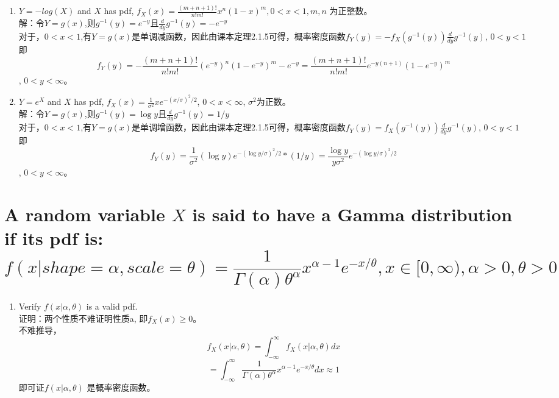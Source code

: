\documentclass [12pt]{article}
\begin{document}
\begin{CJK*}{GBK}{kai}
\begin{enumerate}
  \item[(b)]  $Y=-log(X)$ and $X$ has pdf, $f_{X}(x)=\frac{(m+n+1)!}{n!m!}x^n(1-x)^m, 0<x<1,m,n$ 为正整数。\\
  	解：令$Y=g(x)$,则$g^{-1}(y)=e^{-y}$且$\frac{d}{dy}g^{-1}(y)=-e^{-y}$\\
  	对于，$0<x<1$,有$Y=g(x)$是单调减函数，因此由课本定理2.1.5可得，概率密度函数$f_{Y}(y)=-f_{X}(g^{-1}(y))\frac{d}{dy}g^{-1}(y)$, $0<y<1$\\
	即$$f_{Y}(y)=- \frac{(m+n+1)!}{n!m!} (e^{-y})^n(1-e^{-y})^m  -e^{-y}= \frac{(m+n+1)!}{n!m!}e^{-y(n+1)}(1-e^{-y})^m$$, $0<y<\infty$。

  \item[(c)]  $Y=e^X$ and $X$ has pdf, $f_{X}(x)=\frac{1}{\sigma^2}xe^{-(x/\sigma)^2/2}$, $0<x<\infty$, $ \sigma^2$为正数。\\
  	解：令$Y=g(x)$,则$g^{-1}(y)=\log y$且$\frac{d}{dy}g^{-1}(y)=1/y$\\
  	对于，$0<x<1$,有$Y=g(x)$是单调增函数，因此由课本定理2.1.5可得，概率密度函数$f_{Y}(y)=f_{X}(g^{-1}(y))\frac{d}{dy}g^{-1}(y)$, $0<y<1$\\
	即$$f_{Y}(y)=\frac{1}{\sigma^2}(\log{y})e^{-(\log{y}/\sigma)^2/2}  * (1/y)= \frac{\log{y}}{y\sigma^2}e^{-(\log{y}/\sigma)^2/2}  $$, $0<y<\infty$。

\end{enumerate}  


\section{A random variable $X$ is said to have a Gamma distribution if its pdf is: \\
     $$f(x|shape=\alpha,scale=\theta)=\frac{1}{\Gamma(\alpha)\theta^\alpha}x^{\alpha-1}e^{-x/\theta},x \in [0,\infty), \alpha >0,\theta>0$$}
\begin{enumerate}      
	\item[(a)] Verify $f(x|\alpha,\theta)$ is a valid pdf.\\
		证明：两个性质不难证明性质a, 即$f_{X}(x) \ge 0$。\\
      		不难推导，$$f_{X}(x|\alpha,\theta)=\int_{-\infty}^{\infty}f_{X}(x|\alpha,\theta) dx $$
		$$= \int_{-\infty}^{\infty}\frac{1}{\Gamma(\alpha)\theta^\alpha}x^{\alpha-1}e^{-x/\theta} dx \approx 1$$ 
		即可证$f(x|\alpha,\theta)$ 是概率密度函数。
		

\end{enumerate}
\end{CJK*}
\end{document}
